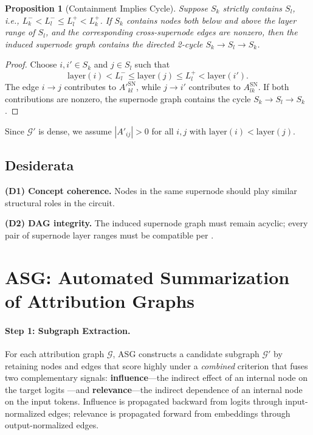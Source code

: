 \documentclass[11pt]{article}
\newcommand{\cG}{\mathcal{G}}
\newtheorem{proposition}{Proposition}
\begin{document}
\begin{proposition}[Containment Implies Cycle]
\label{prop:containment-cycle}
  Suppose $S_k$ strictly contains $S_l$, i.e., $L^-_k < L^-_l \leq L^+_l < L^+_k$. If $S_k$ contains nodes both below and above the layer range of $S_l$, and the corresponding cross-supernode edges are nonzero, then the induced supernode graph contains the directed 2-cycle $S_k \to S_l \to S_k$.
\end{proposition}

\begin{proof}
  Choose $i,i' \in S_k$ and $j \in S_l$ such that
  \[
    \mathrm{layer}(i) < L^-_l \le \mathrm{layer}(j) \le L^+_l < \mathrm{layer}(i').
  \]
  The edge $i \to j$ contributes to $A'^{\mathrm{SN}}_{kl}$, while $j \to i'$ contributes to $A^{\mathrm{SN}}_{lk}$. If both contributions are nonzero, the supernode graph contains the cycle $S_k \to S_l \to S_k$.
\end{proof}

Since $\cG'$ is dense, we assume $|A'_{ij}| > 0$ for all $i,j$ with $\mathrm{layer}(i) < \mathrm{layer}(j)$.

\subsection{Desiderata}
\label{sec:desiderata}

\textbf{(D1) Concept coherence.} Nodes in the same supernode should play similar structural roles in the circuit.

\textbf{(D2) DAG integrity.} The induced supernode graph must remain acyclic; every pair of supernode layer ranges must be compatible per .

\section{ASG: Automated Summarization of Attribution Graphs}

\paragraph{Step 1: Subgraph Extraction.}
For each attribution graph $\cG$, ASG constructs a candidate subgraph $\cG'$ by retaining nodes and edges that score highly under a \emph{combined} criterion that fuses two complementary signals: \textbf{influence}---the indirect effect of an internal node on the target logits \cite{circuit-tracer,arxiv:2410.13032}---and \textbf{relevance}---the indirect dependence of an internal node on the input tokens. Influence is propagated backward from logits through input-normalized edges; relevance is propagated forward from embeddings through output-normalized edges.
\end{document}
